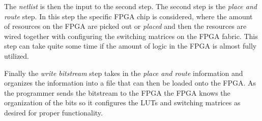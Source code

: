 The \emph{netlist} is then the input to the second step. The second step is the \emph{place and route} step. In this step the specific \ac{FPGA} chip is considered, where the amount of resources on the \ac{FPGA} are picked out or \emph{placed} and then the resources are wired together with configuring the switching matrices on the \ac{FPGA} fabric. This step can take quite some time if the amount of logic in the \ac{FPGA} is almost fully utilized. 

Finally the \emph{write bitstream} step takes in the \emph{place and route} information and organizes the information into a file that can then be loaded onto the \ac{FPGA}. As the programmer sends the bitstream to the \ac{FPGA} the \ac{FPGA} knows the organization of the bits so it configures the \ac{LUT}s and switching matrices as desired for proper functionality. 
	
		
	
